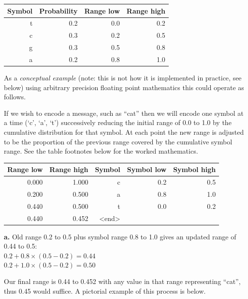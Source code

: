 \documentclass[a4paper]{article}
\begin{document}
\begin{tabular}{rrrr}
\hline
\textbf{Symbol} & \textbf{Probability} & \textbf{Range low} & \textbf{Range high}\\
\hline
t & 0.2 & 0.0 & 0.2 \\
c & 0.3 & 0.2 & 0.5 \\
g & 0.3 & 0.5 & 0.8 \\
a & 0.2 & 0.8 & 1.0 \\
\hline
\end{tabular}

As a \emph{conceptual example} (note: this is not how it is implemented in practice, see below) using arbitrary precision floating point mathematics this could operate as follows.

If we wish to encode a message, such as ``cat'' then we will encode
one symbol at a time (`c', `a', `t') successively reducing the
initial range of 0.0 to 1.0 by the cumulative distribution for that
symbol.  At each point the new range is adjusted to be the proportion
of the previous range covered by the cumulative symbol range.  See the
table footnotes below for the worked mathematics.

\begin{threeparttable}[t]
\begin{tabular}{rrrrr}
\hline
\textbf{Range low} & \textbf{Range high} & \textbf{Symbol} & \textbf{Symbol low} & \textbf{Symbol high}\\
\hline
0.000 & 1.000 & c & 0.2 & 0.5\\
0.200 & 0.500 & a & 0.8 & 1.0\\
0.440\tnote{\textbf{a}} & 0.500\tnote{\textbf{a}} & t & 0.0 & 0.2\\
0.440 & 0.452 & <end>\\
\hline
\end{tabular}
\begin{tablenotes}
\item{\textbf{a.}} Old range 0.2 to 0.5 plus symbol range 0.8 to 1.0 gives an updated range of 0.44 to 0.5:\\
 $0.2 + 0.8\times(0.5-0.2) = 0.44$\\
$0.2 + 1.0\times(0.5-0.2) = 0.50$
\end{tablenotes}
\end{threeparttable}

Our final range is 0.44 to 0.452 with any value in that range representing
``cat'', thus 0.45 would suffice.  A pictorial example of this process is below.
\end{document}
